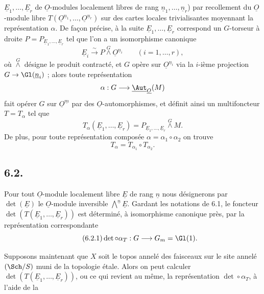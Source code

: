 
\(\underline{E}_1,\ldots,\underline{E}_r\) de \(\underline{O}\)-modules localement libres de rang \(\underline{n}_1,\ldots,\underline{n}_r\)) par recollement du \(\underline{O}\)-module libre \(T(\underline{O}^{\underline{n}_1},\ldots,\underline{O}^{\underline{n}_r})\) sur des cartes locales trivialisantes moyennant la représentation \(\alpha\). De façon précise, à la suite \(\underline{E}_1,\ldots,\underline{E}_r\) correspond un \(G\)-torseur à droite \(P=P_{\underline{E}_1,\ldots,\underline{E}_r}\) tel que l'on a un isomorphisme canonique
\begin{equation}\tag{6.1.3}
 \underline{E}_i\xrightarrow{\sim}P\overset{G}{\wedge}\underline{O}^{\underline{n}_i}\qquad(i=1,\ldots,r),
\end{equation}
où \(\overset{G}{\wedge}\) désigne le produit contracté, et \(G\) opère sur \(\underline{O}^{\underline{n}_i}\) via la \(i\)-ième projection \(G\to\Gl(\underline{n}_i)\) ; alors toute représentation
\[
 \alpha:G\longrightarrow\underline{\Aut}_{\underline{O}}(M)
\]
fait opérer \(G\) sur \(\underline{O}^{\underline{m}}\) par des \(\underline{O}\)-automorphismes, et définit ainsi un multifoncteur \(T=T_\alpha\) tel que
\begin{equation}\tag{6.1.4}
 T_\alpha(\underline{E}_1,\ldots,\underline{E}_r)=P_{\underline{E}_1,\ldots,\underline{E}_r}\overset{G}{\wedge} M.
\end{equation}
De plus, pour toute représentation composée \(\alpha=\alpha_1\circ\alpha_2\) on trouve
\begin{equation}\tag{6.1.5}
 T_\alpha=T_{\alpha_1}\circ T_{\alpha_2}.
\end{equation}

\subsection*{6.2.}
Pour tout \(\underline{O}\)-module localement libre \(\underline{E}\) de rang \(\underline{n}\) nous désignerons par \(\det(\underline{E})\) le \(\underline{O}\)-module inversible \(\bigwedge\limits^{\underline{n}} \underline{E}\). Gardant les notations de 6.1, le foncteur \(\det(T(\underline{E}_1,\ldots,\underline{E}_r))\) est déterminé, à isomorphisme canonique près, par la représentation correspondante
\begin{equation}\tag{6.2.1}
 \det\circ\alpha_T:G\longrightarrow{G}_m=\Gl(1).
\end{equation}

Supposons maintenant que \(X\) soit le topos annelé des faisceaux sur le site annelé \((\Sch/S)\) muni de la topologie étale. Alors on peut calculer \(\det(T(\underline{E}_1,\ldots,\underline{E}_r))\), ou ce qui revient au même, la représentation \(\det\circ\alpha_T\), à l'aide de la

